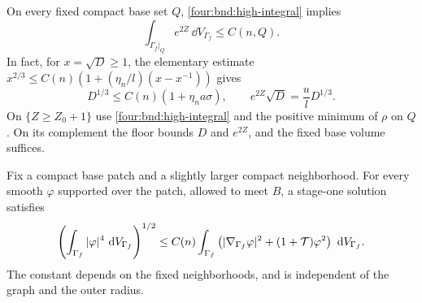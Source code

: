 On every fixed compact base set $Q$, \eqref{four:bnd:high-integral} implies
\begin{equation}\label{four:bnd:starting-L2}
 \int_{\Gamma_f\vert_Q}e^{2Z}\,\dd V_{\Gamma_f}\le C(n,Q).
\end{equation}
In fact, for $x=\sqrt D\ge1$, the elementary estimate
$x^{2/3}\le C(n)(1+(\eta_n/l)(x-x^{-1}))$ gives
\[
 D^{1/3}\le C(n)(1+\eta_na\sigma),\qquad
 e^{2Z}\sqrt D=\frac{u}{l}D^{1/3}.
\]
On $\{Z\ge Z_0+1\}$ use \eqref{four:bnd:high-integral} and the
positive minimum of $\rho$ on $Q$.  On its complement the floor
bounds $D$ and $e^{2Z}$, and the fixed base volume suffices.

\begin{lemma}
\label{four:bnd:graph-sobolev}
Fix a compact base patch and a slightly larger compact neighborhood.
For every smooth $\varphi$ supported over the patch, allowed to meet
$B$, a stage-one solution satisfies
\begin{equation}\label{four:bnd:sobolev}
 \left(\int_{\Gamma_f}|\varphi|^4\,\,\mathrm d V_{\Gamma_f}\right)^{1/2}
 \le C(n)\int_{\Gamma_f}
 \left(|\nabla_{\Gamma_f}\varphi|^2+(1+\mathcal T)\varphi^2\right)
     \,\,\mathrm d V_{\Gamma_f}.
\end{equation}
The constant depends on the fixed neighborhoods, and is independent
of the graph and the outer radius.
\end{lemma}


